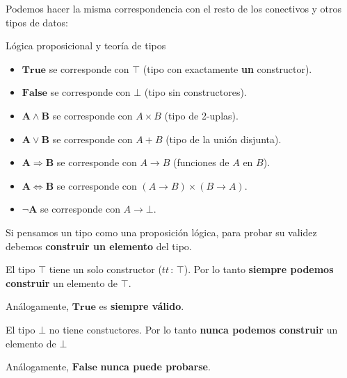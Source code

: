 \documentclass[xcolor=dvipsnames]{beamer} %
\newcommand{\tjud}[2]
  {\ensuremath{#1\,:\,#2}}
\newcommand{\cprod}[2]
  {\ensuremath{#1 \times #2}
 }
\begin{document}
\begin{frame}

 \begin{block}{}
  Podemos hacer la misma correspondencia con el resto de los conectivos y otros tipos de datos:
 \end{block}

 \pause
 
 \begin{block}{Lógica proposicional y teoría de tipos}
  \begin{itemize}
  \item $\mathbf{True}$ se corresponde con $\mathbf{\top}$ (tipo con exactamente \textbf{un} constructor).
  \item $\mathbf{False}$ se corresponde con $\mathbf{\bot}$ (tipo sin constructores).
  \item $\mathbf{A \wedge B}$ se corresponde con $\cprod{A}{B}$ (tipo de 2-uplas).
  \item $\mathbf{A \vee B}$ se corresponde con $A + B$ (tipo de la unión disjunta).
  \item $\mathbf{A \Rightarrow B}$ se corresponde con $A \rightarrow B$ (funciones de $A$ en $B$).
  \item $\mathbf{A \Leftrightarrow B}$ se corresponde con $\cprod{(A \rightarrow B)}{(B \rightarrow A)}$.
  \item $\mathbf{\neg A}$ se corresponde con $A \rightarrow \mathbf{\bot}$.
\end{itemize}
 \end{block}
 
\end{frame}

\begin{frame}
     \begin{block}{}
      Si pensamos un tipo como una proposición lógica, para probar su validez debemos \textbf{construir un elemento}
      del tipo.
     \end{block}
     
     \pause
     
     \begin{block}{}
      El tipo $\top$ tiene un solo constructor ($\tjud{tt}{\top}$). Por lo tanto \textbf{siempre podemos
      construir} un elemento de $\top$.
      
      Análogamente, $\mathbf{True}$ es \textbf{siempre válido}.
     \end{block}

     \pause
     
      \begin{block}{}
      El tipo $\bot$ no tiene constuctores. Por lo tanto \textbf{nunca podemos construir} un elemento
      de $\bot$
      
      Análogamente, $\mathbf{False}$ \textbf{nunca puede probarse}.
     \end{block}

\end{frame}
\end{document}
